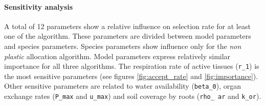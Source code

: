 
\paragraph{Sensitivity analysis}


A total of 12 parameters show a relative influence on selection rate for at least one of the algorithm. These parameters are divided between model parameters and species parameters. Species parameters show influence only for the \textit{non plastic} allocation algorithm. Model parameters express relatively similar importance for all three algorithms. The respiration rate of active tissues (\texttt{r\_1}) is the most sensitive parameters (see figures \ref{fig:accept_rate} and \ref{fig:importance}). Other sensitive parameters are related to water availability (\texttt{beta\_0}), organ exchange rates (\texttt{P\_max} and \texttt{u\_max}) and soil coverage by roots (\texttt{rho\_ ar} and \texttt{k\_or}).

